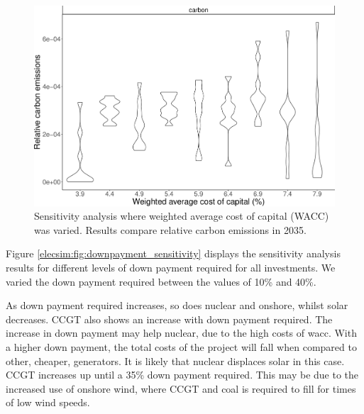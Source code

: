 \begin{figure}
	\centering
	\includegraphics[width=0.9\linewidth]{Chapter4/figures/sensitvity_analysis/wacc_carbon_sensitivity_analysis.pdf}
	\caption{Sensitivity analysis where weighted average cost of capital (WACC) was varied. Results compare relative carbon emissions in 2035.}
	\label{elecsim:fig:wacc_carbon_sensitivity}
\end{figure}

Figure \ref{elecsim:fig:downpayment_sensitivity} displays the sensitivity analysis results for different levels of down payment required for all investments. We varied the down payment required between the values of 10\% and 40\%.

As down payment required increases, so does nuclear and onshore, whilst solar decreases. CCGT also shows an increase with down payment required. The increase in down payment may help nuclear, due to the high costs of \acrshort{wacc}. With a higher down payment, the total costs of the project will fall when compared to other, cheaper, generators. It is likely that nuclear displaces solar in this case. CCGT increases up until a 35\% down payment required. This may be due to the increased use of onshore wind, where CCGT and coal is required to fill for times of low wind speeds.



